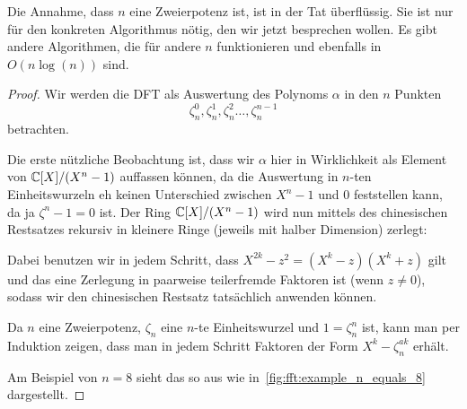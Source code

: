 \begin{remark}
    Die Annahme, dass $n$ eine Zweierpotenz ist, ist in der Tat überflüssig. Sie ist nur für den konkreten Algorithmus nötig, den wir jetzt besprechen wollen. Es gibt andere Algorithmen, die für andere $n$ funktionieren und ebenfalls in $O(n\log(n))$ sind.
\end{remark}
\begin{proof}
    Wir werden die DFT als Auswertung des Polynoms $\alpha$ in den $n$ Punkten
    \[\zeta_n^0, \zeta_n^1,\zeta_n^2 \ldots, \zeta_n^{n-1}\]
    betrachten.

    \smallskip
    Die erste nützliche Beobachtung ist, dass wir $\alpha$ hier in Wirklichkeit als Element von $\mathbb{C}[X]/(X^n-1)$ auffassen können, da die Auswertung in $n$-ten Einheitswurzeln eh keinen Unterschied zwischen $X^n-1$ und $0$ feststellen kann, da ja $\zeta^n-1=0$ ist. Der Ring $\mathbb{C}[X]/(X^n-1)$ wird nun mittels des chinesischen Restsatzes rekursiv in kleinere Ringe (jeweils mit halber Dimension) zerlegt:

    Dabei benutzen wir in jedem Schritt, dass $X^{2k}-z^2 = (X^k-z)(X^k+z)$ gilt und das eine Zerlegung in paarweise teilerfremde Faktoren ist (wenn $z\neq 0$), sodass wir den chinesischen Restsatz tatsächlich anwenden können.

    Da $n$ eine Zweierpotenz, $\zeta_n$ eine $n$-te Einheitswurzel und $1=\zeta_n^n$ ist, kann man per Induktion zeigen, dass man in jedem Schritt Faktoren der Form $X^k-\zeta_n^{ak}$ erhält.

    \medskip
    Am Beispiel von $n=8$ sieht das so aus wie in~\ref{fig:fft:example_n_equals_8} dargestellt.


\end{proof}
